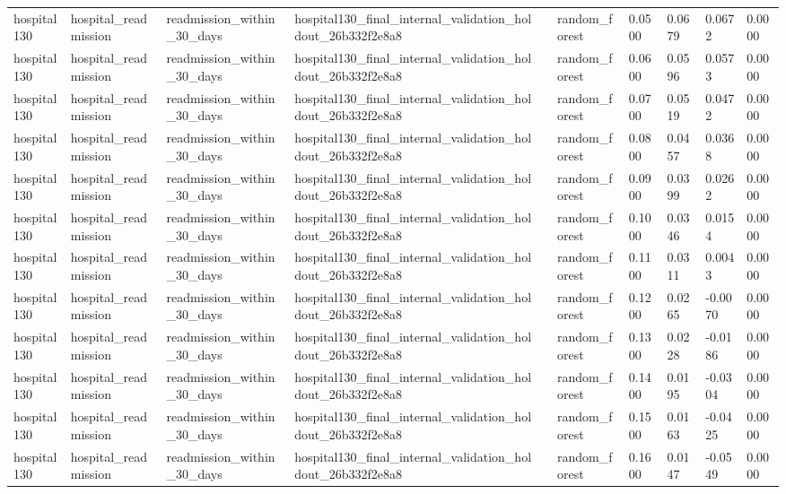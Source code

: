 \begin{tabular}{llllllllll}
hospital130 & hospital\_readmission & readmission\_within\_30\_days & hospital130\_final\_internal\_validation\_holdout\_26b332f2e8a8 &  & random\_forest & 0.0500 & 0.0679 & 0.0672 & 0.0000 \\
hospital130 & hospital\_readmission & readmission\_within\_30\_days & hospital130\_final\_internal\_validation\_holdout\_26b332f2e8a8 &  & random\_forest & 0.0600 & 0.0596 & 0.0573 & 0.0000 \\
hospital130 & hospital\_readmission & readmission\_within\_30\_days & hospital130\_final\_internal\_validation\_holdout\_26b332f2e8a8 &  & random\_forest & 0.0700 & 0.0519 & 0.0472 & 0.0000 \\
hospital130 & hospital\_readmission & readmission\_within\_30\_days & hospital130\_final\_internal\_validation\_holdout\_26b332f2e8a8 &  & random\_forest & 0.0800 & 0.0457 & 0.0368 & 0.0000 \\
hospital130 & hospital\_readmission & readmission\_within\_30\_days & hospital130\_final\_internal\_validation\_holdout\_26b332f2e8a8 &  & random\_forest & 0.0900 & 0.0399 & 0.0262 & 0.0000 \\
hospital130 & hospital\_readmission & readmission\_within\_30\_days & hospital130\_final\_internal\_validation\_holdout\_26b332f2e8a8 &  & random\_forest & 0.1000 & 0.0346 & 0.0154 & 0.0000 \\
hospital130 & hospital\_readmission & readmission\_within\_30\_days & hospital130\_final\_internal\_validation\_holdout\_26b332f2e8a8 &  & random\_forest & 0.1100 & 0.0311 & 0.0043 & 0.0000 \\
hospital130 & hospital\_readmission & readmission\_within\_30\_days & hospital130\_final\_internal\_validation\_holdout\_26b332f2e8a8 &  & random\_forest & 0.1200 & 0.0265 & -0.0070 & 0.0000 \\
hospital130 & hospital\_readmission & readmission\_within\_30\_days & hospital130\_final\_internal\_validation\_holdout\_26b332f2e8a8 &  & random\_forest & 0.1300 & 0.0228 & -0.0186 & 0.0000 \\
hospital130 & hospital\_readmission & readmission\_within\_30\_days & hospital130\_final\_internal\_validation\_holdout\_26b332f2e8a8 &  & random\_forest & 0.1400 & 0.0195 & -0.0304 & 0.0000 \\
hospital130 & hospital\_readmission & readmission\_within\_30\_days & hospital130\_final\_internal\_validation\_holdout\_26b332f2e8a8 &  & random\_forest & 0.1500 & 0.0163 & -0.0425 & 0.0000 \\
hospital130 & hospital\_readmission & readmission\_within\_30\_days & hospital130\_final\_internal\_validation\_holdout\_26b332f2e8a8 &  & random\_forest & 0.1600 & 0.0147 & -0.0549 & 0.0000 \\

\end{tabular}
